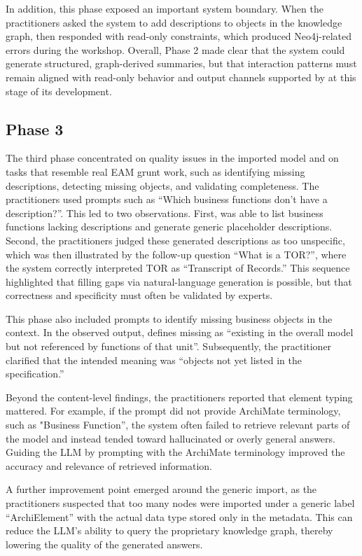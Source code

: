In addition, this phase exposed an important system boundary. When the practitioners asked the system to add descriptions to objects in the knowledge graph, then \prototype{} responded with read-only constraints, which produced Neo4j-related errors during the workshop. Overall, Phase 2 made clear that the system could generate structured, graph-derived summaries, but that interaction patterns must remain aligned with read-only behavior and output channels supported by \prototype{} at this stage of its development.

\subsection{Phase 3}
\label{sub:phase3}
The third phase concentrated on quality issues in the imported model and on tasks that resemble real EAM grunt work, such as identifying missing descriptions, detecting missing objects, and validating completeness. The practitioners used prompts such as “Which business functions don’t have a description?”. This led to two observations. First, \prototype{} was able to list business functions lacking descriptions and generate generic placeholder descriptions. Second, the practitioners judged these generated descriptions as too unspecific, which was then illustrated by the follow-up question “What is a TOR?”, where the system correctly interpreted TOR as “Transcript of Records.” This sequence highlighted that filling gaps via natural-language generation is possible, but that correctness and specificity must often be validated by experts.

This phase also included prompts to identify missing business objects in the context. In the observed output, \prototype{} defines missing as “existing in the overall model but not referenced by functions of that unit”. Subsequently, the practitioner clarified that the intended meaning was “objects not yet listed in the specification.”

Beyond the content-level findings, the practitioners reported that element typing mattered. For example, if the prompt did not provide ArchiMate terminology, such as "Business Function”, the system often failed to retrieve relevant parts of the model and instead tended toward hallucinated or overly general answers. Guiding the LLM by prompting with the ArchiMate terminology improved the accuracy and relevance of retrieved information.

A further improvement point emerged around the generic import, as the practitioners suspected that too many nodes were imported under a generic label “ArchiElement” with the actual data type stored only in the metadata. This can reduce the LLM's ability to query the proprietary knowledge graph, thereby lowering the quality of the generated answers.

